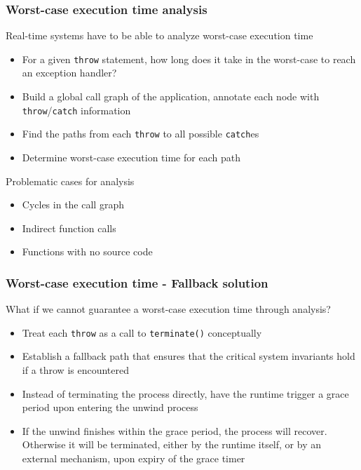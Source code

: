 \documentclass[aspectratio=169]{beamer}
\newif\iftransitions
\newcommand{\cpause}{\iftransitions \pause \fi}
\begin{document}
\begin{frame}

  \frametitle{Worst-case execution time analysis}

  Real-time systems have to be able to analyze worst-case execution time
  
  \cpause
  \begin{itemize}
  \item For a given \texttt{throw} statement, how long does it take in the worst-case to reach an exception handler?
  \item Build a global call graph of the application, annotate each node with \texttt{throw}/\texttt{catch} information
  \item Find the paths from each \texttt{throw} to all possible \texttt{catch}es
  \item Determine worst-case execution time for each path
  \end{itemize}

  \cpause 
  Problematic cases for analysis
  \begin{itemize}
  \cpause \item Cycles in the call graph
  \cpause \item Indirect function calls
  \cpause \item Functions with no source code
  \end{itemize}
\end{frame}


\begin{frame}
\frametitle{Worst-case execution time - Fallback solution}

What if we cannot guarantee a worst-case execution time through analysis?

\begin{itemize}
\cpause \item Treat each \texttt{throw} as a call to \texttt{terminate()} conceptually
\cpause \item Establish a fallback path that ensures that the critical system invariants hold if a throw is encountered
\cpause \item Instead of terminating the process directly, have the runtime trigger a grace period upon entering the unwind process
\cpause \item If the unwind finishes within the grace period, the process will recover. Otherwise it will be terminated, either by the runtime itself, or by an external mechanism, upon expiry of the grace timer
\end{itemize}

\end{frame}
\end{document}
